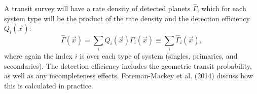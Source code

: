 A transit survey will have a rate density of detected planets $\hat{\Gamma}$, 
which for each system type will be the product of the rate density and the 
detection efficiency $Q_i(\vec{x})$:
\begin{equation}
\hat{\Gamma}(\vec{x}) = \sum_i Q_i(\vec{x}) \Gamma_i(\vec{x}) 
\equiv \sum_i \hat{\Gamma}_i(\vec{x}),
\label{eq:detected_rate_density}
\end{equation}
where again the index $i$ is over each type of system (singles, primaries, 
and secondaries).
The detection efficiency includes the geometric transit probability, as well 
as any incompleteness effects. Foreman-Mackey et al. (2014) discuss how this 
is calculated in practice.


